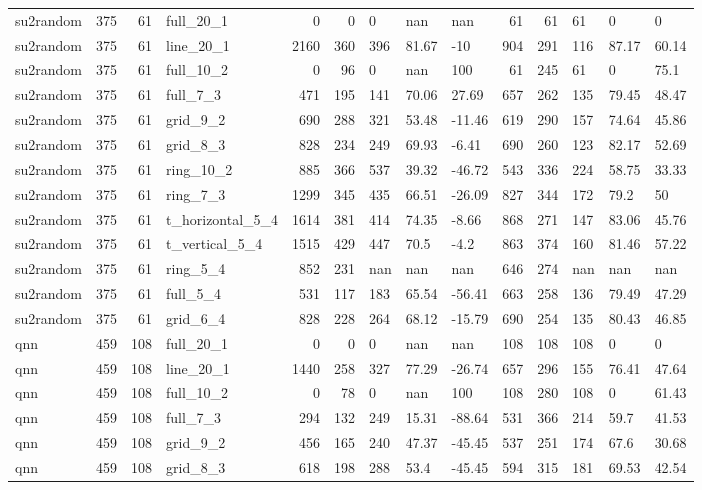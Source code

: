 \begin{longtable}{lrrlrrlllrrlll}
su2random & 375 & 61 & full\_20\_1 & 0 & 0 & 0 & nan & nan & 61 & 61 & 61 & 0 & 0 \\
su2random & 375 & 61 & line\_20\_1 & 2160 & 360 & 396 & 81.67 & -10 & 904 & 291 & 116 & 87.17 & 60.14 \\
su2random & 375 & 61 & full\_10\_2 & 0 & 96 & 0 & nan & 100 & 61 & 245 & 61 & 0 & 75.1 \\
su2random & 375 & 61 & full\_7\_3 & 471 & 195 & 141 & 70.06 & 27.69 & 657 & 262 & 135 & 79.45 & 48.47 \\
su2random & 375 & 61 & grid\_9\_2 & 690 & 288 & 321 & 53.48 & -11.46 & 619 & 290 & 157 & 74.64 & 45.86 \\
su2random & 375 & 61 & grid\_8\_3 & 828 & 234 & 249 & 69.93 & -6.41 & 690 & 260 & 123 & 82.17 & 52.69 \\
su2random & 375 & 61 & ring\_10\_2 & 885 & 366 & 537 & 39.32 & -46.72 & 543 & 336 & 224 & 58.75 & 33.33 \\
su2random & 375 & 61 & ring\_7\_3 & 1299 & 345 & 435 & 66.51 & -26.09 & 827 & 344 & 172 & 79.2 & 50 \\
su2random & 375 & 61 & t\_horizontal\_5\_4 & 1614 & 381 & 414 & 74.35 & -8.66 & 868 & 271 & 147 & 83.06 & 45.76 \\
su2random & 375 & 61 & t\_vertical\_5\_4 & 1515 & 429 & 447 & 70.5 & -4.2 & 863 & 374 & 160 & 81.46 & 57.22 \\
su2random & 375 & 61 & ring\_5\_4 & 852 & 231 & nan & nan & nan & 646 & 274 & nan & nan & nan \\
su2random & 375 & 61 & full\_5\_4 & 531 & 117 & 183 & 65.54 & -56.41 & 663 & 258 & 136 & 79.49 & 47.29 \\
su2random & 375 & 61 & grid\_6\_4 & 828 & 228 & 264 & 68.12 & -15.79 & 690 & 254 & 135 & 80.43 & 46.85 \\
qnn & 459 & 108 & full\_20\_1 & 0 & 0 & 0 & nan & nan & 108 & 108 & 108 & 0 & 0 \\
qnn & 459 & 108 & line\_20\_1 & 1440 & 258 & 327 & 77.29 & -26.74 & 657 & 296 & 155 & 76.41 & 47.64 \\
qnn & 459 & 108 & full\_10\_2 & 0 & 78 & 0 & nan & 100 & 108 & 280 & 108 & 0 & 61.43 \\
qnn & 459 & 108 & full\_7\_3 & 294 & 132 & 249 & 15.31 & -88.64 & 531 & 366 & 214 & 59.7 & 41.53 \\
qnn & 459 & 108 & grid\_9\_2 & 456 & 165 & 240 & 47.37 & -45.45 & 537 & 251 & 174 & 67.6 & 30.68 \\
qnn & 459 & 108 & grid\_8\_3 & 618 & 198 & 288 & 53.4 & -45.45 & 594 & 315 & 181 & 69.53 & 42.54 \\

\end{longtable}
